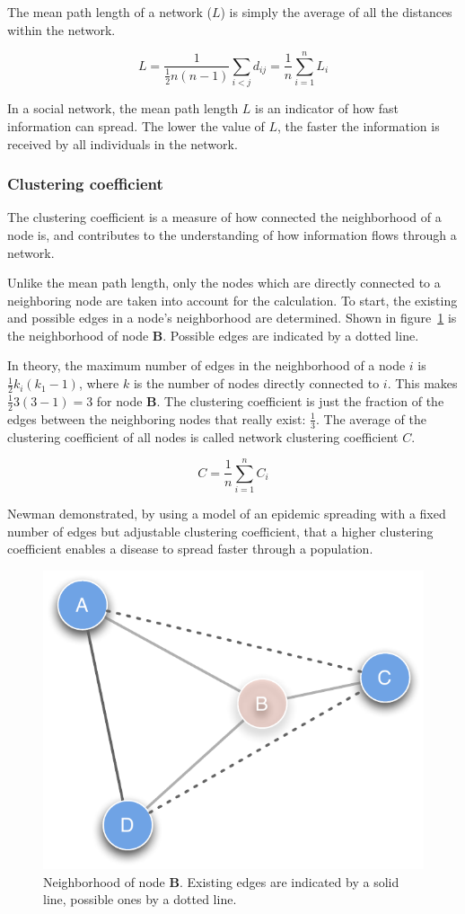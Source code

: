 The mean path length of a network ($L$) is simply the average of all the distances within the network.

\begin{equation}
L = \frac{1}{ \frac{1}{2}n(n-1)}\sum_{i<j} d_{ij} = \frac{1}{n}\sum^n_{i=1}L_i
\label{eq:mean_path_lenght}
\end{equation} 

In a social network, the mean path length $L$ is an indicator of how fast information can spread. The lower the value of $L$, the faster the information is received by all individuals in the network.  

\subsubsection{Clustering coefficient}

The clustering coefficient is a measure of how connected the neighborhood of a node is, and contributes to the understanding of how information flows through a network.

Unlike the mean path length, only the nodes which are directly connected to a neighboring node are taken into account for the calculation. To start, the existing and possible edges in a node's neighborhood are determined. Shown in figure~\ref{fig:clust_coeff} is the neighborhood of node \textbf{B}. Possible edges are indicated by a dotted line.

In theory, the maximum number of edges in the neighborhood of a node $i$ is $\frac{1}{2}k_i(k_1 -1)$, where $k$ is the number of nodes directly connected to $i$. This makes $\frac{1}{2}3(3 -1) = 3$ for node \textbf{B}. The clustering coefficient is just the fraction of the edges between the neighboring nodes that really exist: $\frac{1}{3}$. The average of the clustering coefficient of all nodes is called network clustering coefficient $C$.

\begin{equation}
C = \frac{1}{n}\sum^n_{i=1}C_i
\end{equation}  

Newman\citep{newman:03} demonstrated, by using a model of an epidemic spreading with a fixed number of edges but adjustable clustering coefficient, that a higher clustering coefficient enables a disease to spread faster through a population.

\begin{figure}[htpb]
\begin{center}
  \includegraphics[width=.33\textwidth]{assets/pdf/clustering_coefficient.pdf}
  \caption[Neighborhood of node \textit{B}]{Neighborhood of node \textbf{B}. Existing edges are indicated by a solid line, possible ones by a dotted line.}
  \label{fig:clust_coeff}
\end{center}
\end{figure}
     
